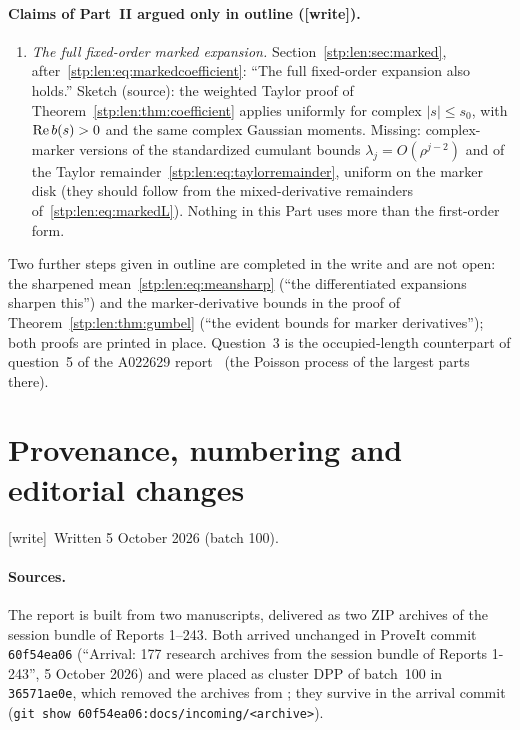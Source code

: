 \documentclass[11pt]{article}
\theoremstyle{remark}\newtheorem{remark}[theorem]{Remark}
\newcommand{\wtag}{\textup{[write]}}
\begin{document}
\paragraph{Claims of Part~II argued only in outline (\wtag).}
\begin{enumerate}[label=(\roman*),start=7]
\item \emph{The full fixed-order marked expansion.} Section~\ref{stp:len:sec:marked},
after~\eqref{stp:len:eq:markedcoefficient}: ``The full fixed-order
expansion also holds.'' Sketch (source): the weighted Taylor proof of
Theorem~\ref{stp:len:thm:coefficient} applies uniformly for complex
$|s|\le s_0$, with $\operatorname{Re} b(s)>0$ and the same complex Gaussian moments.
Missing: complex-marker versions of the standardized cumulant bounds
$\lambda_j=O(\rho^{j-2})$ and of the Taylor remainder~\eqref{stp:len:eq:taylorremainder},
uniform on the marker disk (they should follow from the mixed-derivative
remainders of~\eqref{stp:len:eq:markedL}). Nothing in this Part uses
more than the first-order form.
\end{enumerate}
Two further steps given in outline are completed in the write and are not
open: the sharpened mean~\eqref{stp:len:eq:meansharp} (``the differentiated
expansions sharpen this'') and the marker-derivative bounds in the proof of
Theorem~\ref{stp:len:thm:gumbel} (``the evident bounds for marker
derivatives''); both proofs are printed in place. Question~3 is the
occupied-length counterpart of question~5 of the A022629
report~\cite{priornorm} (the Poisson process of the largest parts there).


\appendix
\section{Provenance, numbering and editorial changes}\label{stp:app:provenance}

\wtag\ Written 5 October 2026 (batch 100).

\paragraph{Sources.} The report is built from two manuscripts, delivered as
two ZIP archives of the session bundle of Reports 1--243. Both arrived
unchanged in ProveIt commit \texttt{60f54ea06} (``Arrival: 177 research
archives from the session bundle of Reports 1-243'', 5 October 2026) and
were placed as cluster DPP of batch~100 in \texttt{36571ae0e}, which removed
the archives from ; they survive in the arrival commit
(\texttt{git show 60f54ea06:docs/incoming/<archive>}).
\end{document}
